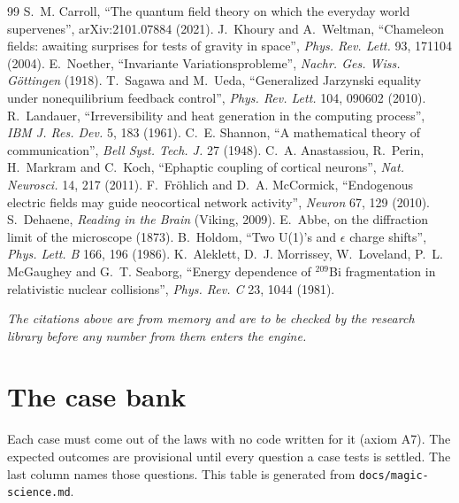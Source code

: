 \documentclass[11pt,a4paper]{article}
\begin{document}
\begin{thebibliography}{99}\small
{} S.~M. Carroll, ``The quantum field theory on which the everyday world supervenes'', arXiv:2101.07884 (2021).
 J.~Khoury and A.~Weltman, ``Chameleon fields: awaiting surprises for tests of gravity in space'', \emph{Phys. Rev. Lett.} 93, 171104 (2004).
 E.~Noether, ``Invariante Variationsprobleme'', \emph{Nachr. Ges. Wiss. G\"ottingen} (1918).
 T.~Sagawa and M.~Ueda, ``Generalized Jarzynski equality under nonequilibrium feedback control'', \emph{Phys. Rev. Lett.} 104, 090602 (2010).
 R.~Landauer, ``Irreversibility and heat generation in the computing process'', \emph{IBM J. Res. Dev.} 5, 183 (1961).
 C.~E. Shannon, ``A mathematical theory of communication'', \emph{Bell Syst. Tech. J.} 27 (1948).
 C.~A. Anastassiou, R.~Perin, H.~Markram and C.~Koch, ``Ephaptic coupling of cortical neurons'', \emph{Nat. Neurosci.} 14, 217 (2011).
 F.~Fr\"ohlich and D.~A. McCormick, ``Endogenous electric fields may guide neocortical network activity'', \emph{Neuron} 67, 129 (2010).
 S.~Dehaene, \emph{Reading in the Brain} (Viking, 2009).
 E.~Abbe, on the diffraction limit of the microscope (1873).
 B.~Holdom, ``Two U(1)'s and $\epsilon$ charge shifts'', \emph{Phys. Lett. B} 166, 196 (1986).
 K.~Aleklett, D.~J. Morrissey, W.~Loveland, P.~L. McGaughey and G.~T. Seaborg, ``Energy dependence of $^{209}$Bi fragmentation in relativistic nuclear collisions'', \emph{Phys. Rev. C} 23, 1044 (1981).
\end{thebibliography}
\noindent\textit{The citations above are from memory and are to be checked by the research library before any number from them enters the engine.}

\appendix
\section{The case bank}\label{app:cases}

Each case must come out of the laws with no code written for it (axiom A7). The expected outcomes are provisional until every question a case tests is settled. The last column names those questions. This table is generated from \texttt{docs/magic-science.md}.

{\small}
\end{document}
